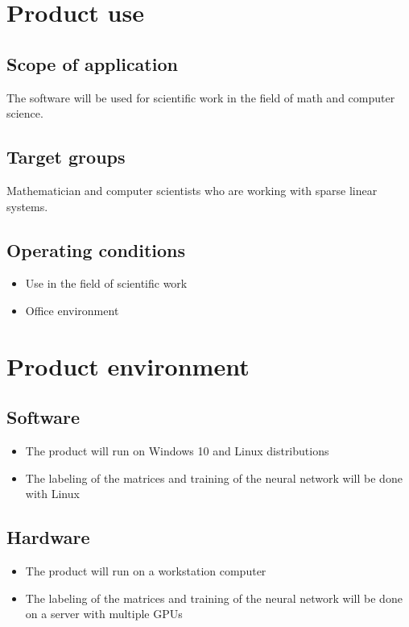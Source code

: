 \documentclass[parskip=full]{scrartcl}
\begin{document}
\section{Product use}
\subsection{Scope of application}
The software will be used for scientific work in the field of math and computer science.
\subsection{Target groups}
Mathematician and computer scientists who are working with sparse linear systems.
\subsection{Operating conditions}

\begin{itemize}
\item Use in the field of scientific work
\item Office environment
\end{itemize}

\section{Product environment}


\subsection{Software}

\begin{itemize}
\item The product will run on Windows 10 and Linux distributions 
\item The labeling of the matrices and training of the neural network will be done with Linux
\end{itemize}

\subsection{Hardware}

\begin{itemize}
\item The product will run on a workstation computer
\item The labeling of the matrices and training of the neural network will be done on a server with multiple GPUs
\end{itemize}
\end{document}
